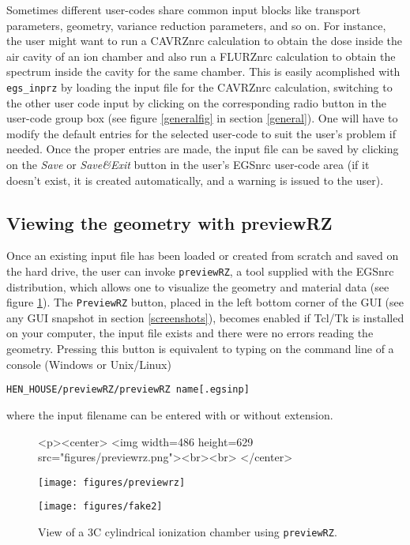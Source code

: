 \documentclass[12pt,twoside]{article}   %
\begin{document}
 Sometimes different user-codes share common input blocks like transport parameters,
 geometry, variance reduction parameters, and so on. For instance,
 the user might want to run a CAVRZnrc calculation to obtain the dose inside the air
 cavity of an ion chamber and also run a FLURZnrc calculation to obtain the spectrum
 inside the cavity for the same chamber. This is easily acomplished with {\tt egs\_inprz}
 by loading the input file for the CAVRZnrc calculation, switching to the other user
 code input by  clicking on the corresponding radio button in
 the user-code group box (see figure \ref{generalfig} in section \ref{general}).
One will have to modify the default entries for the selected user-code to suit the user's
problem if needed. Once the proper entries are made, the input file can be saved by
clicking on the {\em Save} or {\em Save\&Exit} button
in the user's EGSnrc user-code area (if it doesn't exist, it is created automatically,
 and a warning is issued to the user).\\

\subsection{Viewing the geometry with previewRZ}

Once an existing input file has been loaded or created from scratch and saved on
the hard drive,
the user can invoke
{\tt previewRZ}, a tool supplied with the EGSnrc distribution, which allows one
to visualize the geometry and material data (see figure \ref{view}).
The {\tt PreviewRZ} button, placed in the left bottom corner of the GUI
(see any GUI snapshot in section \ref{screenshots}),
becomes enabled if Tcl/Tk is installed on your computer, the input file exists
and there were no errors reading the geometry. Pressing this button is equivalent
to typing on the command line of a console (Windows or Unix/Linux)

 {\tt HEN\_HOUSE/previewRZ/previewRZ name[.egsinp]}

\noindent where the input filename can be entered with or without extension. \\

\begin{figure}[h]
\begin{htmlonly}
\begin{rawhtml}
<p><center>
<img width=486 height=629 src="figures/previewrz.png"><br><br>
</center>
\end{rawhtml}
\end{htmlonly}
\begin{latexonly}
\begin{center}
\texttt{[image: figures/previewrz]}
\end{center}
\end{latexonly}
\begin{center}
\texttt{[image: figures/fake2]}
\end{center}
\caption{View of a 3C cylindrical ionization chamber using {\tt previewRZ}.}
\label{view}
\end{figure}
\end{document}
